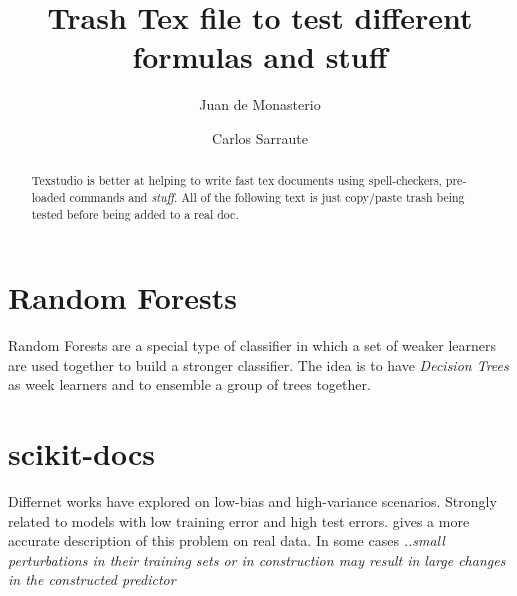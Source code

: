 \documentclass{article}%
\theoremstyle{definition}
\begin{document}

\title{Trash Tex file to test different formulas and stuff}




\author{
Juan de Monasterio
\and Carlos Sarraute
}

%
%


\maketitle
\begin{abstract}

Texstudio is better at helping to write fast tex documents using spell-checkers, pre-loaded commands and \textit{stuff}. All of the following text is just copy/paste trash being tested before being added to a real doc.


\end{abstract}


\section{Random Forests}

Random Forests are a special type of classifier in which a set of weaker learners are used together to build a stronger classifier. The idea is to have \textit{Decision Trees} as week learners and to ensemble a group of trees together.
	
\section{scikit-docs}

Differnet works have explored on low-bias and high-variance scenarios. Strongly related to models with low training error and high test errors.  \cite{breiman-arcingclassifiers} gives a more accurate description of this problem on real data. In some cases \textit{..small perturbations in their  training  sets  or  in  construction  may  result  in  large  changes  in  the  constructed  predictor}
	
\end{document}
